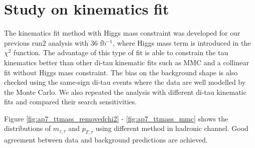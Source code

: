 \section{Study on kinematics fit}
\label{sec:kine}

The kinematics fit method with Higgs mass constraint was developed for our previous run2 analysis with 36 fb$^{-1}$, where Higgs mass term is introduced
in the $\chi^2$ function. The advantage of this type of fit is able to constrain the tau kinematics better than other di-tau kinematic fits such as MMC and
a collinear fit without Higgs mass constraint. The bias on the background shape is also checked using the same-sign di-tau events where the data are well modelled
by the Monte Carlo. We also repeated the analysis with different di-tau kinematic fits and compared their search sensitivities.

Figure \ref{fig:ap7_ttmass_removedchi2} - \ref{fig:ap7_ttmass_mmc} shows the distributions of $m_{\tau,\tau}$ and $p_{T,\tau}$ using different method in hadronic channel. Good agreement between data and background predictions are achieved.




